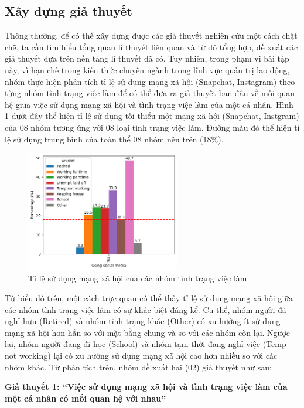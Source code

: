 \subsection{Xây dựng giả thuyết}
Thông thường, để có thể xây dựng được các giả thuyết nghiên cứu một cách chặt chẽ, ta cần tìm hiểu tổng quan lí thuyết liên quan và từ đó tổng hợp, đề xuất các giả thuyết dựa trên nền tảng lí thuyết đã có. Tuy nhiên, trong phạm vi bài tập này, vì hạn chế trong kiến thức chuyên ngành trong lĩnh vực quản trị lao động, nhóm thực hiện phân tích tỉ lệ sử dụng mạng xã hội (Snapchat, Instagram) theo từng nhóm tình trạng việc làm để có thể đưa ra giả thuyết ban đầu về mối quan hệ giữa việc sử dụng mạng xã hội và tình trạng việc làm của một cá nhân. Hình \ref{fig:using_social_media} dưới đây thể hiện tỉ lệ sử dụng tối thiểu một mạng xã hội (Snapchat, Instgram) của 08 nhóm tương ứng với 08 loại tình trạng việc làm. Đường màu đỏ thể hiện tỉ lệ sử dụng trung bình của toàn thể 08 nhóm nêu trên (18\%).

\begin{figure}[h!]
    \centering
    \includegraphics[width=0.6\textwidth]{figures/using_social_media.png}
    \caption{Tỉ lệ sử dụng mạng xã hội của các nhóm tình trạng việc làm}
    \label{fig:using_social_media}
\end{figure}

Từ biểu đồ trên, một cách trực quan có thể thấy tỉ lệ sử dụng mạng xã hội giữa các nhóm tình trạng việc làm có sự khác biệt đáng kể. Cụ thể, nhóm người đã nghỉ hưu (Retired) và nhóm tình trạng khác (Other) có xu hướng ít sử dụng mạng xã hội hơn hẳn so với mặt bằng chung và so với các nhóm còn lại. Ngược lại, nhóm người đang đi học (School) và nhóm tạm thời đang nghỉ việc (Temp not working) lại có xu hướng sử dụng mạng xã hội cao hơn nhiều so với các nhóm khác. Từ phân tích trên, nhóm đề xuất hai (02) giả thuyết như sau:

\textbf{Giả thuyết 1: “Việc sử dụng mạng xã hội và tình trạng việc làm của một cá nhân có mối quan hệ với nhau”}

